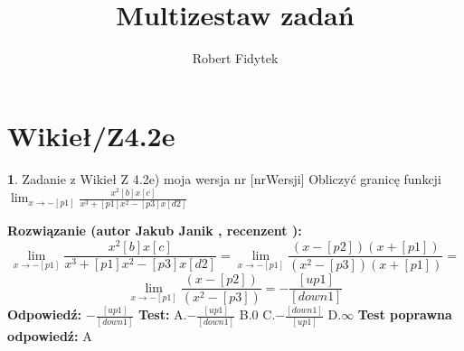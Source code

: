 \documentclass[12pt, a4paper]{article}
\title{Multizestaw zadań}
\author{Robert Fidytek}
\date{}
\theoremstyle{definition} %
\newtheorem{zad}{}
\newcommand{\kategoria}[1]{\section{#1}} %
\newcommand{\zadStart}[1]{\begin{zad}#1\newline} %
\newcommand{\zadStop}{\end{zad}}   %
\newcommand{\rozwStart}[2]{\noindent \textbf{Rozwiązanie (autor #1 , recenzent #2): }\newline} %
\newcommand{\rozwStop}{\newline}                                            %
\newcommand{\odpStart}{\noindent \textbf{Odpowiedź:}\newline}    %
\newcommand{\odpStop}{\newline}                                             %
\newcommand{\testStart}{\noindent \textbf{Test:}\newline} %
\newcommand{\testStop}{\newline} %
\newcommand{\kluczStart}{\noindent \textbf{Test poprawna odpowiedź:}\newline} %
\newcommand{\kluczStop}{\newline} %
\begin{document}
\maketitle


\kategoria{Wikieł/Z4.2e}
\zadStart{Zadanie z Wikieł Z 4.2e) moja wersja nr [nrWersji]}
Obliczyć granicę funkcji $\lim_{x \to -[p1]} \frac{x^2 [b]x [c]}{x^3 + [p1]x^2 - [p3]x [d2]}$
\zadStop
\rozwStart{Jakub Janik}{}
$$\lim_{x \to -[p1]} \frac{x^2 [b]x [c]}{x^3 + [p1]x^2 - [p3]x [d2]}=\lim_{x \to -[p1]} \frac{(x-[p2])(x+[p1])}{(x^2-[p3])(x+[p1])}=$$
$$\lim_{x \to -[p1]} \frac{(x-[p2])}{(x^2-[p3])}=-\frac{[up1]}{[down1]}$$
\rozwStop
\odpStart
$-\frac{[up1]}{[down1]}$
\odpStop
\testStart
A.$-\frac{[up1]}{[down1]}$
B.$0$
C.$-\frac{[down1]}{[up1]}$
D.$\infty$
\testStop
\kluczStart
A
\kluczStop
\end{document}
